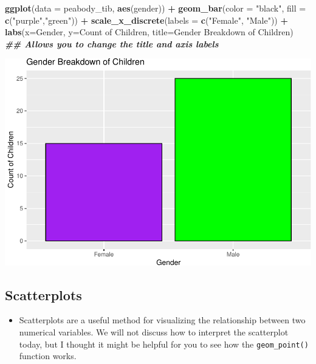 \documentclass[
]{book}
\newenvironment{Shaded}{\begin{snugshade}}{\end{snugshade}}
\newcommand{\AttributeTok}[1]{\textcolor[rgb]{0.13,0.29,0.53}{#1}}
\newcommand{\DocumentationTok}[1]{\textcolor[rgb]{0.56,0.35,0.01}{\textbf{\textit{#1}}}}
\newcommand{\FunctionTok}[1]{\textcolor[rgb]{0.13,0.29,0.53}{\textbf{#1}}}
\newcommand{\NormalTok}[1]{#1}
\newcommand{\SpecialCharTok}[1]{\textcolor[rgb]{0.81,0.36,0.00}{\textbf{#1}}}
\newcommand{\StringTok}[1]{\textcolor[rgb]{0.31,0.60,0.02}{#1}}
\providecommand{\tightlist}{%
  \setlength{\itemsep}{0pt}\setlength{\parskip}{0pt}}
\begin{document}
\begin{Shaded}
\begin{Highlighting}[]
\FunctionTok{ggplot}\NormalTok{(}\AttributeTok{data =}\NormalTok{ peabody\_tib, }\FunctionTok{aes}\NormalTok{(gender)) }\SpecialCharTok{+} 
  \FunctionTok{geom\_bar}\NormalTok{(}\AttributeTok{color =} \StringTok{"black"}\NormalTok{, }\AttributeTok{fill =} \FunctionTok{c}\NormalTok{(}\StringTok{"purple"}\NormalTok{,}\StringTok{"green"}\NormalTok{)) }\SpecialCharTok{+}
  \FunctionTok{scale\_x\_discrete}\NormalTok{(}\AttributeTok{labels =} \FunctionTok{c}\NormalTok{(}\StringTok{"Female"}\NormalTok{, }\StringTok{"Male"}\NormalTok{)) }\SpecialCharTok{+}
  \FunctionTok{labs}\NormalTok{(}\AttributeTok{x=}\StringTok{\textquotesingle{}Gender\textquotesingle{}}\NormalTok{,}
       \AttributeTok{y=}\StringTok{\textquotesingle{}Count of Children\textquotesingle{}}\NormalTok{,}
       \AttributeTok{title=}\StringTok{\textquotesingle{}Gender Breakdown of Children\textquotesingle{}}\NormalTok{) }\DocumentationTok{\#\# Allows you to change the title and axis labels}
\end{Highlighting}
\end{Shaded}

\includegraphics{PSY202A-Modeling-I.Heo_files/figure-latex/unnamed-chunk-81-1.pdf}

\subsection{Scatterplots}\label{scatterplots}

\begin{itemize}
\tightlist
\item
  Scatterplots are a useful method for visualizing the relationship between two numerical variables. We will not discuss how to interpret the scatterplot today, but I thought it might be helpful for you to see how the \texttt{geom\_point()} function works.
\end{itemize}
\end{document}
